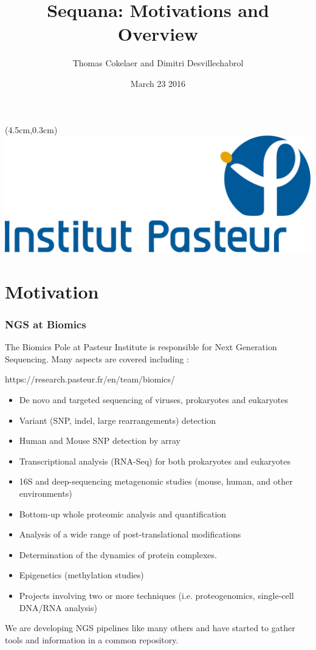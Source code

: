 \documentclass{beamer}
\title{Sequana: Motivations and Overview}
\author[T.Cokelaer \& D.Desvillechabrol]{Thomas Cokelaer and Dimitri Desvillechabrol}
\institute{Institut Pasteur}
\date{March 23 2016}
\begin{document}

\begin{frame}[plain]
    \titlepage
    \begin{textblock*}{5cm}(4.5cm,0.3cm)
        \includegraphics[scale=0.09]{Institut_Pasteur.png}
    \end{textblock*}
\end{frame}


\section{Motivation}

\begin{frame}
 \frametitle{NGS at Biomics}
 
 The Biomics Pole at Pasteur Institute is responsible for Next Generation Sequencing. Many aspects are covered including :
 
 \tiny
 \begin{block}{https://research.pasteur.fr/en/team/biomics/}
  \begin{itemize}
  \item De novo and targeted sequencing of viruses, prokaryotes and eukaryotes
  \item Variant (SNP, indel, large rearrangements) detection
  \item Human and Mouse SNP detection by array
  \item Transcriptional analysis (RNA-Seq) for both prokaryotes and eukaryotes
  \item 16S and deep-sequencing metagenomic studies (mouse, human, and other environments)
  \item Bottom-up whole proteomic analysis and quantification
  \item Analysis of a wide range of post-translational modifications
  \item Determination of the dynamics of protein complexes.
  \item Epigenetics (methylation studies)
  \item Projects involving two or more techniques (i.e. proteogenomics, single-cell DNA/RNA analysis)
  \end{itemize}
 \end{block}
 \small 
 We are developing NGS pipelines like many others and have started to gather tools and information in a common repository.
\end{frame}
\end{document}
